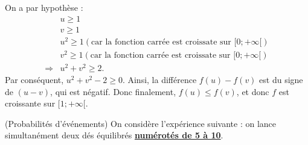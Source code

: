 \documentclass[12pt,
addpoints,
fleqn
]{exam}
\begin{document}
\begin{questions}
\begin{solution}
\begin{parts}
\begin{subparts}
On a par hypothèse :
\begin{align*}
    &u \geq 1 \\
    &v \geq 1\\
    &u^2 \geq 1 (\text{car la fonction carrée est croissate sur $[0;+\infty[$})\\
    & v^2\geq 1 (\text{car la fonction carrée est croissate sur $[0;+\infty[$})\\
    \Rightarrow &u^2 + v^2 \geq 2.
\end{align*}
Par conséquent, $u^2+v^2 -2 \geq 0$. Ainsi, la différence $f(u)-f(v)$ est du signe de $(u-v)$, qui est négatif.
Donc finalement, $f(u)\leq f(v)$, et donc $f$ est croissante sur $[1;+\infty[$.


\end{subparts}


\end{parts}

\end{solution}




\question (Probabilités d'événements)
On considère l'expérience suivante : on lance simultanément deux dés équilibrés \underline{\textbf{numérotés de 5 à 10}}.
\end{questions}
\end{document}
